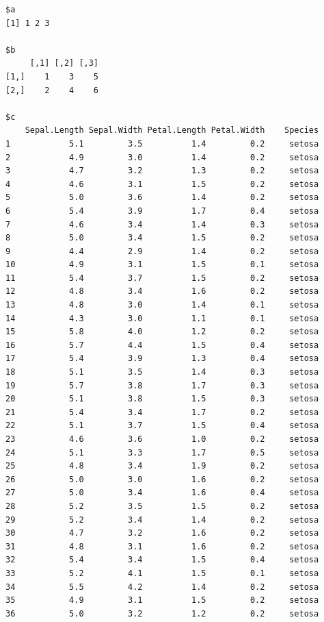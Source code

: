 \documentclass[
  letterpaper,
  DIV=11,
  numbers=noendperiod]{scrreprt}
\begin{document}
\begin{verbatim}
$a
[1] 1 2 3

$b
     [,1] [,2] [,3]
[1,]    1    3    5
[2,]    2    4    6

$c
    Sepal.Length Sepal.Width Petal.Length Petal.Width    Species
1            5.1         3.5          1.4         0.2     setosa
2            4.9         3.0          1.4         0.2     setosa
3            4.7         3.2          1.3         0.2     setosa
4            4.6         3.1          1.5         0.2     setosa
5            5.0         3.6          1.4         0.2     setosa
6            5.4         3.9          1.7         0.4     setosa
7            4.6         3.4          1.4         0.3     setosa
8            5.0         3.4          1.5         0.2     setosa
9            4.4         2.9          1.4         0.2     setosa
10           4.9         3.1          1.5         0.1     setosa
11           5.4         3.7          1.5         0.2     setosa
12           4.8         3.4          1.6         0.2     setosa
13           4.8         3.0          1.4         0.1     setosa
14           4.3         3.0          1.1         0.1     setosa
15           5.8         4.0          1.2         0.2     setosa
16           5.7         4.4          1.5         0.4     setosa
17           5.4         3.9          1.3         0.4     setosa
18           5.1         3.5          1.4         0.3     setosa
19           5.7         3.8          1.7         0.3     setosa
20           5.1         3.8          1.5         0.3     setosa
21           5.4         3.4          1.7         0.2     setosa
22           5.1         3.7          1.5         0.4     setosa
23           4.6         3.6          1.0         0.2     setosa
24           5.1         3.3          1.7         0.5     setosa
25           4.8         3.4          1.9         0.2     setosa
26           5.0         3.0          1.6         0.2     setosa
27           5.0         3.4          1.6         0.4     setosa
28           5.2         3.5          1.5         0.2     setosa
29           5.2         3.4          1.4         0.2     setosa
30           4.7         3.2          1.6         0.2     setosa
31           4.8         3.1          1.6         0.2     setosa
32           5.4         3.4          1.5         0.4     setosa
33           5.2         4.1          1.5         0.1     setosa
34           5.5         4.2          1.4         0.2     setosa
35           4.9         3.1          1.5         0.2     setosa
36           5.0         3.2          1.2         0.2     setosa

\end{verbatim}
\end{document}
